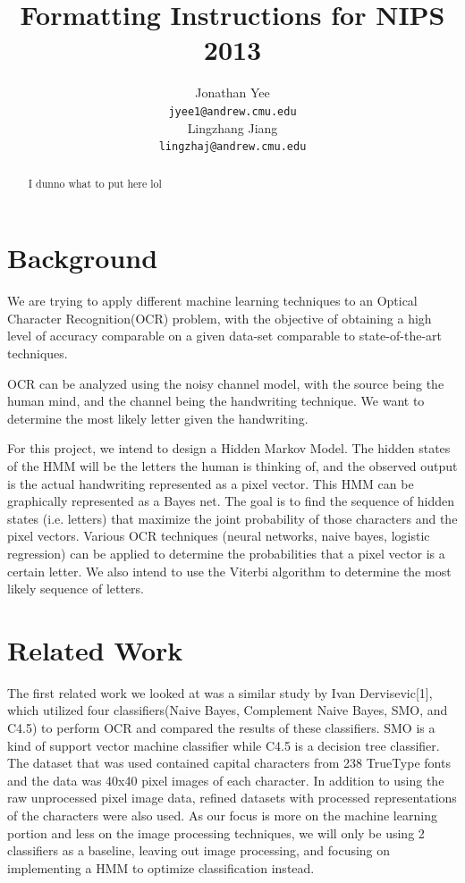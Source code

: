 \documentclass{article} %
\title{Formatting Instructions for NIPS 2013}
\author{
Jonathan Yee\\
\texttt{jyee1@andrew.cmu.edu} \\
\And
Lingzhang Jiang \\
\texttt{lingzhaj@andrew.cmu.edu} \\
}
\begin{document}
\maketitle

\begin{abstract}
I dunno what to put here lol
\end{abstract}

\section{Background}
We are trying to apply different machine learning techniques to an Optical Character Recognition(OCR) problem, with the objective of obtaining a high level of accuracy comparable on a given data-set comparable to state-of-the-art techniques.

OCR can be analyzed using the noisy channel model, with the source being the human mind, and the channel being the handwriting technique. We want to determine the most likely letter given the handwriting. 

For this project, we intend to design a Hidden Markov Model. The hidden states of the HMM will be the letters the human is thinking of, and the observed output is the actual handwriting represented as a pixel vector. This HMM can be graphically represented as a Bayes net. The goal is to find the sequence of hidden states (i.e. letters) that maximize the joint probability of those characters and the pixel vectors. Various OCR techniques (neural networks, naive bayes, logistic regression) can be applied to determine the probabilities that a pixel vector is a certain letter. We also intend to use the Viterbi algorithm to determine the most likely sequence of letters.

\section{Related Work}
The first related work we looked at was a similar study by Ivan Dervisevic[1], which utilized four classifiers(Naive Bayes, Complement Naive Bayes, SMO, and C4.5) to perform OCR and compared the results of these classifiers. SMO is a kind of support vector machine classifier while C4.5 is a decision tree classifier. The dataset that was used contained capital characters from 238 TrueType fonts and the data was 40x40 pixel images of each character. In addition to using the raw unprocessed pixel image data, refined datasets with processed representations of the characters were also used. As our focus is more on the machine learning portion and less on the image processing techniques, we will only be using 2 classifiers as a baseline, leaving out image processing, and focusing on implementing a HMM to optimize classification instead.
\end{document}
